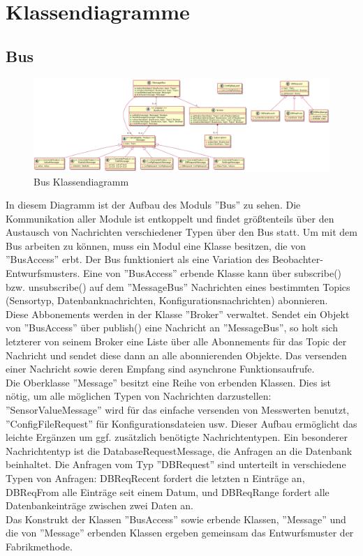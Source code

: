 \documentclass[entwurf.tex]{subfiles}
\begin{document}
\chapter{Klassendiagramme}
	\section{Bus}
		\begin{figure}[h!]
  			\begin{center}
 				\includegraphics[width=0.8\textheight,angle=90]{diagrams/Bus.png}
  				\caption{Bus Klassendiagramm}
  			\end{center}
  		\end{figure}
  		In diesem Diagramm ist der Aufbau des Moduls ''Bus'' zu sehen. Die Kommunikation aller Module ist entkoppelt und findet größtenteils über den Austausch von Nachrichten verschiedener Typen über den Bus statt. Um mit dem Bus arbeiten zu können, muss ein Modul eine Klasse besitzen, die von ''BusAccess'' erbt. Der Bus funktioniert als eine Variation des Beobachter-Entwurfsmusters. Eine von ''BusAccess'' erbende Klasse kann über subscribe() bzw. unsubscribe() auf dem ''MessageBus'' Nachrichten eines bestimmten Topics (Sensortyp, Datenbanknachrichten, Konfigurationsnachrichten) abonnieren. \\
  		Diese Abbonements werden in der Klasse ''Broker'' verwaltet. Sendet ein Objekt von ''BusAccess'' über publish() eine Nachricht an ''MessageBus'', so holt sich letzterer von seinem Broker eine Liste über alle Abonnements für das Topic der Nachricht und sendet diese dann an alle abonnierenden Objekte. Das versenden einer Nachricht sowie deren Empfang sind asynchrone Funktionsaufrufe. \\
  		Die Oberklasse ''Message'' besitzt eine Reihe von erbenden Klassen. Dies ist nötig, um alle möglichen Typen von Nachrichten darzustellen: ''SensorValueMessage'' wird für das einfache versenden von Messwerten benutzt, ''ConfigFileRequest'' für Konfigurationsdateien usw. Dieser Aufbau ermöglicht das leichte Ergänzen um ggf. zusätzlich benötigte Nachrichtentypen. Ein besonderer Nachrichtentyp ist die DatabaseRequestMessage, die Anfragen an die Datenbank beinhaltet. Die Anfragen vom Typ ''DBRequest'' sind unterteilt in verschiedene Typen von Anfragen: DBReqRecent fordert die letzten n Einträge an, DBReqFrom alle Einträge seit einem Datum, und DBReqRange fordert alle Datenbankeinträge zwischen zwei Daten an. \\
  		Das Konstrukt  der Klassen ''BusAccess'' sowie erbende Klassen, ''Message'' und die von ''Message'' erbenden Klassen ergeben gemeinsam das Entwurfsmuster der Fabrikmethode. 
  		
\end{document}
